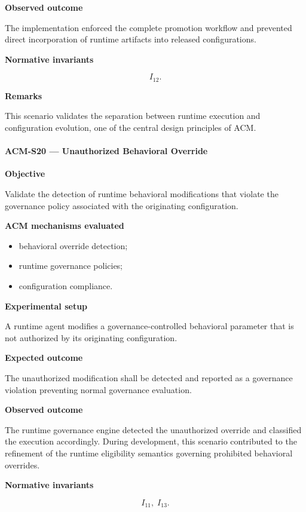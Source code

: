 \documentclass[10pt]{article}
\begin{document}
\textbf{Observed outcome}

The implementation enforced the complete promotion workflow and prevented
direct incorporation of runtime artifacts into released configurations.

\textbf{Normative invariants}

\[
I_{12}.
\]

\textbf{Remarks}

This scenario validates the separation between runtime execution and
configuration evolution, one of the central design principles of ACM.

\paragraph{ACM-S20 --- Unauthorized Behavioral Override}

\textbf{Objective}

Validate the detection of runtime behavioral modifications that violate the
governance policy associated with the originating configuration.

\textbf{ACM mechanisms evaluated}

\begin{itemize}
    \item behavioral override detection;
    \item runtime governance policies;
    \item configuration compliance.
\end{itemize}

\textbf{Experimental setup}

A runtime agent modifies a governance-controlled behavioral parameter that is
not authorized by its originating configuration.

\textbf{Expected outcome}

The unauthorized modification shall be detected and reported as a governance
violation preventing normal governance evaluation.

\textbf{Observed outcome}

The runtime governance engine detected the unauthorized override and classified
the execution accordingly. During development, this scenario contributed to the
refinement of the runtime eligibility semantics governing prohibited
behavioral overrides.

\textbf{Normative invariants}

\[
I_{11},\;
I_{13}.
\]
\end{document}

